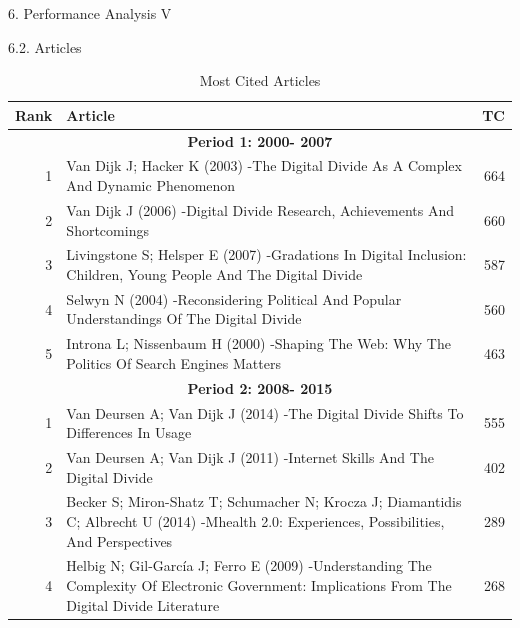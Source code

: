 \documentclass[
  ignorenonframetext,
]{beamer}
\begin{document}
\begin{frame}{6. Performance Analysis V}
\protect\hypertarget{performance-analysis-v}{}
\begin{block}{6.2. Articles}
\protect\hypertarget{articles}{}
\begin{table}

\caption{\label{tab:Influence of AU table }Most Cited Articles}
\centering
\fontsize{5}{7}\selectfont
\begin{tabular}[t]{r|p{9cm}|r}
\hline
\textbf{Rank} & \textbf{Article} & \textbf{TC}\\
\hline
\multicolumn{3}{c}{\textbf{Period 1: 2000- 2007}}\\
\hline
\hspace{1em}1 & Van Dijk J; Hacker K (2003) -The Digital Divide As A Complex And Dynamic Phenomenon & 664\\
\hline
\hspace{1em}2 & Van Dijk J (2006) -Digital Divide Research, Achievements And Shortcomings & 660\\
\hline
\hspace{1em}3 & Livingstone S; Helsper E (2007) -Gradations In Digital Inclusion: Children, Young People And The Digital Divide & 587\\
\hline
\hspace{1em}4 & Selwyn N (2004) -Reconsidering Political And Popular Understandings Of The Digital Divide & 560\\
\hline
\hspace{1em}5 & Introna L; Nissenbaum H (2000) -Shaping The Web: Why The Politics Of Search Engines Matters & 463\\
\hline
\multicolumn{3}{c}{\textbf{Period 2: 2008- 2015}}\\
\hline
\hspace{1em}1 & Van Deursen A; Van Dijk J (2014) -The Digital Divide Shifts To Differences In Usage & 555\\
\hline
\hspace{1em}2 & Van Deursen A; Van Dijk J (2011) -Internet Skills And The Digital Divide & 402\\
\hline
\hspace{1em}3 & Becker S; Miron-Shatz T; Schumacher N; Krocza J; Diamantidis C; Albrecht U (2014) -Mhealth 2.0: Experiences, Possibilities, And Perspectives & 289\\
\hline
\hspace{1em}4 & Helbig N; Gil-García J; Ferro E (2009) -Understanding The Complexity Of Electronic Government: Implications From The Digital Divide Literature & 268\\

\end{tabular}
\end{table}
\end{block}
\end{frame}
\end{document}
